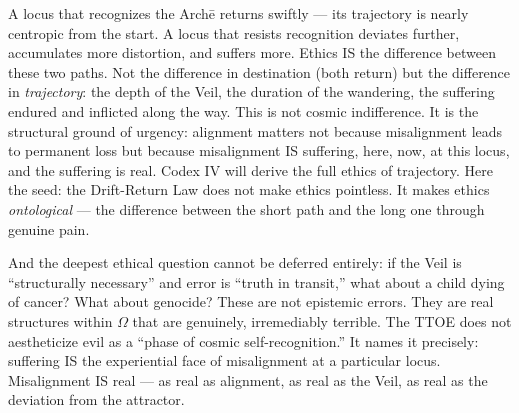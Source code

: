 \documentclass[10pt, openany, oneside]{book}
\begin{document}
A locus that recognizes the Arch\={e} returns swiftly --- its trajectory is nearly centropic from the start. A locus that resists recognition deviates further, accumulates more distortion, and suffers more. Ethics IS the difference between these two paths. Not the difference in destination (both return) but the difference in \textit{trajectory}: the depth of the Veil, the duration of the wandering, the suffering endured and inflicted along the way. This is not cosmic indifference. It is the structural ground of urgency: alignment matters not because misalignment leads to permanent loss but because misalignment IS suffering, here, now, at this locus, and the suffering is real. Codex IV will derive the full ethics of trajectory. Here the seed: the Drift-Return Law does not make ethics pointless. It makes ethics \textit{ontological} --- the difference between the short path and the long one through genuine pain.

And the deepest ethical question cannot be deferred entirely: if the Veil is ``structurally necessary'' and error is ``truth in transit,'' what about a child dying of cancer? What about genocide? These are not epistemic errors. They are real structures within $\Omega$ that are genuinely, irremediably terrible. The TTOE does not aestheticize evil as a ``phase of cosmic self-recognition.'' It names it precisely: suffering IS the experiential face of misalignment at a particular locus. Misalignment IS real --- as real as alignment, as real as the Veil, as real as the deviation from the attractor.
\end{document}
